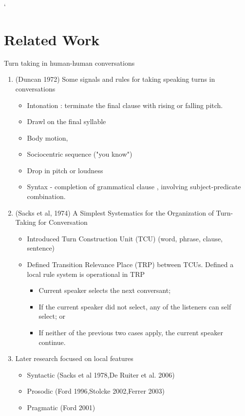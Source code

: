 `%

\section{Related Work}
\frame{\sectionpage}


\begin{frame}{Turn taking in human-human conversations}
    \begin{enumerate}
       \item (Duncan 1972) Some signals and rules for taking speaking turns in conversations
          \begin{itemize}
            \item Intonation : terminate the final clause with rising or falling pitch.
            \item Drawl on the final syllable
            \item Body motion,
            \item Sociocentric sequence ("you know")
            \item Drop in pitch or loudness
            \item Syntax - completion of grammatical clause , involving subject-predicate combination.
          \end{itemize}
       \item (Sacks et al, 1974) A Simplest Systematics for the Organization of Turn-Taking for Conversation
          \begin{itemize}
            \item Introduced Turn Construction Unit (TCU) (word, phrase, clause, sentence)
            \item Defined Transition Relevance Place (TRP) between TCUs. Defined a local rule system is operational in TRP
            \begin{itemize}
                \item Current speaker selects the next conversant;
                \item If the current speaker did not select, any of the listeners can self select; or
                \item If neither of the previous two cases apply, the current speaker continue.
            \end{itemize}
          \end{itemize}
       \item Later research focused on local features
        \begin{itemize}
            \item Syntactic (Sacks et al 1978,De Ruiter et al. 2006)
            \item Prosodic (Ford 1996,Stolcke 2002,Ferrer 2003)
            \item Pragmatic (Ford 2001)
        \end{itemize}
    \end{enumerate}
\end{frame}

